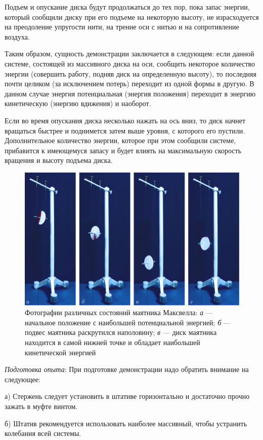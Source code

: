 \documentclass[14pt,a4paper,oneside]{extarticle}	%
\begin{document}
Подъем и опускание диска будут продолжаться до тех пор, пока запас энергии, который сообщили диску при его подъеме на некоторую высоту, не израсходуется на преодоление упругости нити, на трение оси с нитью и на сопротивление воздуха.

Таким образом, сущность демонстрации заключается в следующем: если данной системе, состоящей из массивного диска на оси, сообщить некоторое количество энергии (совершить работу, подняв диск на определенную высоту), то последняя почти целиком (за исключением потерь) переходит из одной формы в другую.
В данном случае энергия потенциальная (энергия положения) переходит в энергию кинетическую (энергию вдижения) и наоборот.

Если во время опускания диска несколько нажать на ось вниз, то диск начнет вращаться быстрее и поднимется затем выше уровня, с которого его пустили.
Дополнительное количество энергии, которое при этом сообщили системе, прибавится к имеющемуся запасу и будет влиять на максимальную скорость вращения и высоту подъема диска.
	
\begin{figure}[H] 	
\centering 	
\includegraphics[width=0.85\linewidth]{Maxwell-2.png}
\caption{Фотографии различных состояний маятника Максвелла: \textit{а} — начальное положение с наибольшей потенциальной энергией; \textit{б} — подвес маятника раскрутился наполовину; \textit{в} — диск маятника находится в самой нижней точке и обладает наибольшей кинетической энергией}
\label{Maxwell-2}
\end{figure}
	
\textit{Подготовка опыта}: При подготовке демонстрации надо обратить внимание на следующее:

а) Стержень следует установить в штативе горизонтально и достаточно прочно зажать в муфте винтом.

б) Штатив рекомендуется использовать наиболее массивный, чтобы устранить колебания всей системы.
\end{document}
